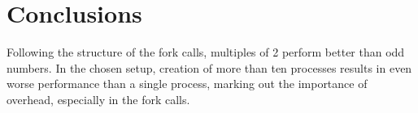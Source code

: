 \documentclass[a4paper]{article}
\begin{document}
\section{Conclusions}

Following the structure of the fork calls, multiples of 2 perform better than odd numbers. In the chosen setup, creation of more than ten processes results in even worse performance than a single process, marking out the importance of overhead, especially in the fork calls.

% 

\end{document}
